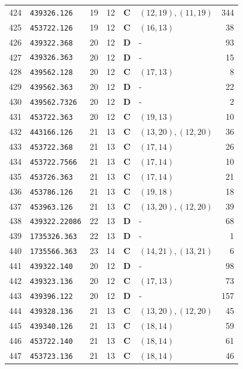 \documentclass[11pt,a4paper]{article}
\begin{document}
\begin{small}
\begin{longtable}{r l c c c l r}
424 & \texttt{439326.126} & 19 & 12 & \textbf{C} & $(12,19), (11,19)$ & 344 \\
425 & \texttt{453722.126} & 19 & 12 & \textbf{C} & $(16,13)$ & 38 \\
426 & \texttt{439322.368} & 20 & 12 & \textbf{D} & - & 93 \\
427 & \texttt{439326.363} & 20 & 12 & \textbf{D} & - & 15 \\
428 & \texttt{439562.128} & 20 & 12 & \textbf{C} & $(17,13)$ & 8 \\
429 & \texttt{439562.363} & 20 & 12 & \textbf{D} & - & 22 \\
430 & \texttt{439562.7326} & 20 & 12 & \textbf{D} & - & 2 \\
431 & \texttt{453722.363} & 20 & 12 & \textbf{C} & $(19,13)$ & 10 \\
432 & \texttt{443166.126} & 21 & 13 & \textbf{C} & $(13,20), (12,20)$ & 36 \\
433 & \texttt{453722.368} & 21 & 13 & \textbf{C} & $(17,14)$ & 26 \\
434 & \texttt{453722.7566} & 21 & 13 & \textbf{C} & $(17,14)$ & 10 \\
435 & \texttt{453726.363} & 21 & 13 & \textbf{C} & $(17,14)$ & 21 \\
436 & \texttt{453786.126} & 21 & 13 & \textbf{C} & $(19,18)$ & 18 \\
437 & \texttt{453963.126} & 21 & 13 & \textbf{C} & $(13,20), (12,20)$ & 39 \\
438 & \texttt{439322.22086} & 22 & 13 & \textbf{D} & - & 68 \\
439 & \texttt{1735326.363} & 22 & 13 & \textbf{D} & - & 1 \\
440 & \texttt{1735566.363} & 23 & 14 & \textbf{C} & $(14,21), (13,21)$ & 6 \\
441 & \texttt{439322.140} & 20 & 12 & \textbf{D} & - & 98 \\
442 & \texttt{439323.136} & 20 & 12 & \textbf{C} & $(17,13)$ & 73 \\
443 & \texttt{439396.122} & 20 & 12 & \textbf{D} & - & 157 \\
444 & \texttt{439328.136} & 21 & 13 & \textbf{C} & $(13,20), (12,20)$ & 45 \\
445 & \texttt{439340.126} & 21 & 13 & \textbf{C} & $(18,14)$ & 59 \\
446 & \texttt{453722.140} & 21 & 13 & \textbf{C} & $(18,14)$ & 61 \\
447 & \texttt{453723.136} & 21 & 13 & \textbf{C} & $(18,14)$ & 46 \\

\end{longtable}
\end{small}
\end{document}
